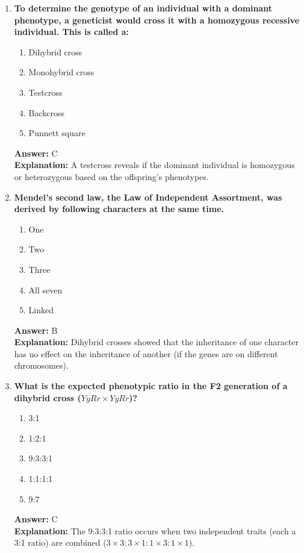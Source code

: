 \documentclass[11pt, a4paper]{article}
\begin{document}
\begin{enumerate}[leftmargin=*, label=\arabic*.]
\item \textbf{To determine the genotype of an individual with a dominant phenotype, a geneticist would cross it with a homozygous recessive individual. This is called a:}
\begin{enumerate}[label=\Alph*.]
\item Dihybrid cross
\item Monohybrid cross
\item Testcross
\item Backcross
\item Punnett square
\end{enumerate}
\textbf{Answer:} C \\
\textbf{Explanation:} A testcross reveals if the dominant individual is homozygous or heterozygous based on the offspring's phenotypes.

\item \textbf{Mendel’s second law, the Law of Independent Assortment, was derived by following \underline{\hspace{1cm}} characters at the same time.}
\begin{enumerate}[label=\Alph*.]
\item One
\item Two
\item Three
\item All seven
\item Linked
\end{enumerate}
\textbf{Answer:} B \\
\textbf{Explanation:} Dihybrid crosses showed that the inheritance of one character has no effect on the inheritance of another (if the genes are on different chromosomes).

\item \textbf{What is the expected phenotypic ratio in the F2 generation of a dihybrid cross ($YyRr \times YyRr$)?}
\begin{enumerate}[label=\Alph*.]
\item 3:1
\item 1:2:1
\item 9:3:3:1
\item 1:1:1:1
\item 9:7
\end{enumerate}
\textbf{Answer:} C \\
\textbf{Explanation:} The 9:3:3:1 ratio occurs when two independent traits (each a 3:1 ratio) are combined ($3 \times 3 : 3 \times 1 : 1 \times 3 : 1 \times 1$).


\end{enumerate}
\end{document}
